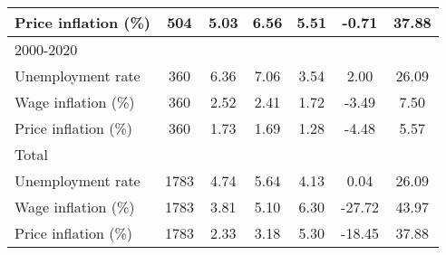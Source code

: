 \begin{table}[htbp]
\begin{tabular}{l*{1}{cccccc}}
Price inflation (\%)&         504&        5.03&        6.56&        5.51&       -0.71&       37.88\\
\hline
2000-2020           &            &            &            &            &            &            \\
Unemployment rate   &         360&        6.36&        7.06&        3.54&        2.00&       26.09\\
Wage inflation (\%) &         360&        2.52&        2.41&        1.72&       -3.49&        7.50\\
Price inflation (\%)&         360&        1.73&        1.69&        1.28&       -4.48&        5.57\\
\hline
Total               &            &            &            &            &            &            \\
Unemployment rate   &        1783&        4.74&        5.64&        4.13&        0.04&       26.09\\
Wage inflation (\%) &        1783&        3.81&        5.10&        6.30&      -27.72&       43.97\\
Price inflation (\%)&        1783&        2.33&        3.18&        5.30&      -18.45&       37.88\\
\hline\hline
\end{tabular}
\end{table}
